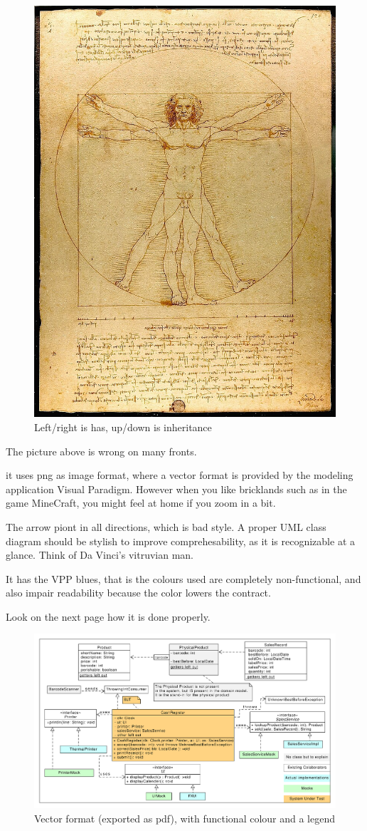 \begin{figure}
  \includegraphics[width=.4\textwidth]{images/Da_Vinci_Vitruve_Luc_Viatour.jpg}
  \caption{Left/right is has, up/down is inheritance}
\end{figure}
The picture above is wrong on many fronts.
\begin{Itemize}
\item it uses png as image format, where a vector format is provided by the modeling application Visual Paradigm.
  However when you like bricklands such as in the game MineCraft, you might feel at home if you zoom in a bit.
\item The arrow piont in all directions, which is bad style. A proper UML class diagram should be stylish to improve comprehesability, as it is recognizable at a glance. Think of Da Vinci's vitruvian man.
\item It has the VPP blues, that is the colours used are completely non-functional, and also impair
  readability because the color lowers the contract.
\end{Itemize}

Look on the next page how it is done properly.
\clearpage

\begin{figure}[htbp]
  \includegraphics[width=\linewidth]{images/perishablesales.pdf}
  \caption{\label{fig:cashregistertest}Vector format (exported as pdf), with functional colour and a legend}
\end{figure}

